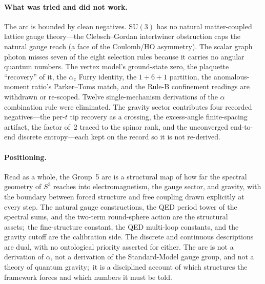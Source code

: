 \documentclass[aps,pra,twocolumn,superscriptaddress,longbibliography]{revtex4-2}
\newcommand{\gvc}[2]{#2}
\begin{document}
\paragraph{What was tried and did not work.}
The arc is bounded by clean negatives.  $\mathrm{SU}(3)$ has no natural
matter-coupled lattice gauge theory---the Clebsch--Gordan intertwiner
obstruction caps the natural gauge reach (a face of the Coulomb/HO
asymmetry).  The scalar graph photon misses seven of the eight selection
rules because it carries no angular quantum numbers.  The vertex model's
ground-state zero, the plaquette ``recovery'' of it, the $\alpha_z$
Furry identity, the $1{+}6{+}1$ partition, the anomalous-moment ratio's
Parker--Toms match, and the Rule-B
confinement readings are withdrawn or re-scoped.  \gvc{three-homes-negative}{Twelve
single-mechanism derivations of the $\alpha$ combination rule were
eliminated}.  The gravity sector contributes four recorded negatives---the
per-$t$ tip recovery as a crossing, the excess-angle finite-spacing
artifact, the factor of~2 traced to the spinor rank, and the unconverged
end-to-end discrete entropy---each kept on the record so it is not
re-derived.

\paragraph{Positioning.}
Read as a whole, the Group~5 arc is a structural map of how far the
spectral geometry of $S^3$ reaches into electromagnetism, the gauge
sector, and gravity, with the boundary between forced structure and free
coupling drawn explicitly at every step.  The natural gauge
constructions, the QED period tower of the spectral sums, and the
two-term round-sphere action are the structural assets;\ the fine-structure constant, the QED
multi-loop constants, and the gravity cutoff are the calibration side.
The discrete and continuous descriptions are dual, with no ontological
priority asserted for either.  The arc is not a derivation of $\alpha$,
not a derivation of the Standard-Model gauge group, and not a theory of
quantum gravity;\ it is a disciplined account of which structures the
framework forces and which numbers it must be told.
\end{document}
